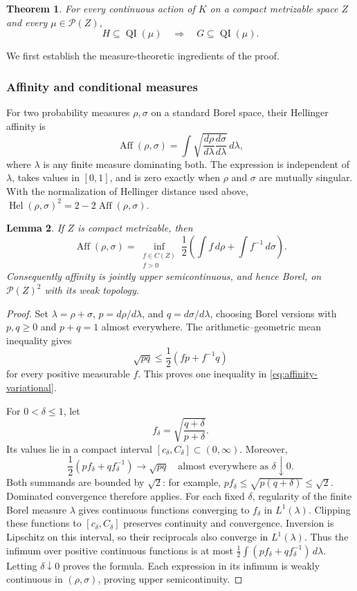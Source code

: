 \documentclass[11pt]{article}
\numberwithin{equation}{section}
\newtheorem{theorem}{Theorem}[section]
\newtheorem{lemma}[theorem]{Lemma}
\theoremstyle{definition}
\newcommand{\Prob}{\mathcal P}
\newcommand{\Hel}{\operatorname{Hel}}
\newcommand{\Aff}{\operatorname{Aff}}
\newcommand{\QI}{\operatorname{QI}}
\begin{document}
\begin{theorem}\label{thm:rigidity}
For every continuous action of $K$ on a compact metrizable space $Z$
and every $\mu\in\Prob(Z)$,
\[
 H\subseteq\QI(\mu)\quad\Longrightarrow\quad G\subseteq\QI(\mu).
\]
\end{theorem}

We first establish the measure-theoretic ingredients of the proof.

\subsubsection{Affinity and conditional measures}

For two probability measures $\rho,\sigma$ on a standard Borel space,
their Hellinger affinity is
\[
 \Aff(\rho,\sigma)
 =\int\sqrt{\frac{d\rho}{d\lambda}
                  \frac{d\sigma}{d\lambda}}\,d\lambda,
\]
where $\lambda$ is any finite measure dominating both. The expression
is independent of $\lambda$, takes values in $[0,1]$, and is zero
exactly when $\rho$ and $\sigma$ are mutually singular. With the
normalization of Hellinger distance used above,
$\Hel(\rho,\sigma)^2=2-2\Aff(\rho,\sigma)$.

\begin{lemma}\label{lem:affinity-usc}
If $Z$ is compact metrizable, then
\begin{equation}\label{eq:affinity-variational}
 \Aff(\rho,\sigma)
 =\inf_{\substack{f\in C(Z)\\ f>0}}
       \frac12\left(\int f\,d\rho+\int f^{-1}\,d\sigma\right).
\end{equation}
Consequently affinity is jointly upper semicontinuous, and hence
Borel, on $\Prob(Z)^2$ with its weak topology.
\end{lemma}

\begin{proof}
Set $\lambda=\rho+\sigma$, $p=d\rho/d\lambda$, and
$q=d\sigma/d\lambda$, choosing Borel versions with $p,q\geq0$ and
$p+q=1$ almost everywhere. The arithmetic--geometric mean inequality
gives
\[
 \sqrt{pq}\leq\frac12(fp+f^{-1}q)
\]
for every positive measurable $f$. This proves one inequality in
\eqref{eq:affinity-variational}.

For $0<\delta\leq1$, let
\[
 f_\delta=\sqrt{\frac{q+\delta}{p+\delta}}.
\]
Its values lie in a compact interval $[c_\delta,C_\delta]\subset(0,\infty)$.
Moreover,
\[
 \frac12(pf_\delta+qf_\delta^{-1})\longrightarrow\sqrt{pq}
 \quad\text{almost everywhere as }\delta\downarrow0.
\]
Both summands are bounded by $\sqrt2$: for example,
$pf_\delta\leq\sqrt{p(q+\delta)}\leq\sqrt2$.
Dominated convergence therefore applies. For each fixed $\delta$,
regularity of the finite Borel measure $\lambda$ gives continuous
functions converging to $f_\delta$ in $L^1(\lambda)$. Clipping these
functions to $[c_\delta,C_\delta]$ preserves continuity and convergence.
Inversion is Lipschitz on this interval, so their reciprocals also
converge in $L^1(\lambda)$. Thus the infimum over positive continuous
functions is at most
$\frac12\int(pf_\delta+qf_\delta^{-1})\,d\lambda$.
Letting $\delta\downarrow0$ proves the formula. Each expression in its
infimum is weakly continuous in $(\rho,\sigma)$, proving upper
semicontinuity.
\end{proof}
\end{document}
